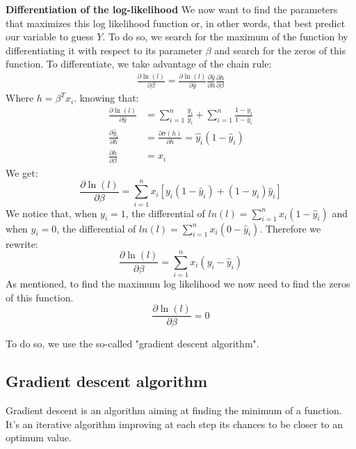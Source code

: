 		\vspace{\baselineskip}
		\textbf{Differentiation of the log-likelihood}
		We now want to find the parameters that maximizes this log likelihood function or, in other words, that best predict our variable to guess $Y$. To do so, we search for the maximum of the function by differentiating it with respect to its parameter $\beta$ and search for the zeros of this function. To differentiate, we take advantage of the chain rule:
		\begin{equation}
			\begin{split}
				\frac{\partial \ln(l)}{\partial \beta }  = 
				\frac{\partial \ln(l)}{\partial \hat{y}}
				\frac{\partial \hat{y}}{\partial h}
				\frac{\partial h}{\partial \beta}
			\end{split}
		\end{equation}
		Where $h = \beta^T x_i$.
		knowing that: 
		\begin{equation}
			\begin{split}
			\frac{\partial \ln(l)}{\partial \hat{y}} &=  \sum_{i=1}^n \frac{y_i}{\hat{y}_i} + \sum_{i=1}^n \frac{1-y_i}{1-\hat{y}_i} \\
			\frac{\partial \hat{y}_i}{\partial h} &= \frac{\partial \sigma(h)}{\partial h} = \hat{y_i} (1-\hat{y}_i) \\
			\frac{\partial h}{\partial \beta} &= x_i
			\end{split}
		\end{equation}
		We get:
		$$ \frac{\partial \ln(l)}{\partial \beta }  = \sum_{i=1}^n x_i[y_i(1-\hat{y}_i) + (1-y_i)\hat{y}_i] $$
		We notice that, when $y_i = 1$, the differential of $ln(l) = \sum_{i=1}^n x_i(1-\hat{y}_i) $ and when $y_i = 0$, the differential of $ln(l) = \sum_{i=1}^n x_i(0-\hat{y}_i) $. Therefore we rewrite:
		$$ \frac{\partial \ln(l)}{\partial \beta }  = \sum_{i=1}^n x_i(y_i-\hat{y}_i) $$
		As mentioned, to find the maximum log likelihood we now need to find the zeros of this function.
		$$ \frac{\partial \ln(l)}{\partial \beta } = 0 $$

		To do so, we use the so-called "gradient descent algorithm".

	\subsection{Gradient descent algorithm}

		Gradient descent is an algorithm aiming at finding the minimum of a function. It's an iterative algorithm improving at each step its chances to be closer to an optimum value.

